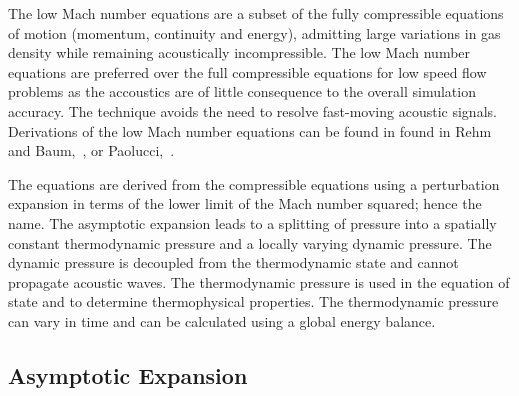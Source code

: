 The low Mach number equations are a subset of the fully compressible
equations of motion (momentum, continuity and energy), admitting large
variations in gas density while remaining acoustically incompressible.
The low Mach number equations are preferred over the full compressible
equations for low speed flow problems as the accoustics are of 
little consequence to the overall simulation accuracy. The technique avoids 
the need to resolve fast-moving acoustic signals.  
Derivations of the low Mach number equations can be found in 
found in Rehm and Baum,~\cite{Rehm:1978}, or Paolucci,~\cite{Paolucci:1982}. 

The equations are derived from
the compressible equations using a perturbation expansion in terms
of the lower limit of the Mach number squared; hence the name.  The
asymptotic expansion leads to a splitting of pressure
into a spatially constant thermodynamic pressure and a locally
varying dynamic pressure.  The dynamic pressure is decoupled from
the thermodynamic state and cannot propagate acoustic waves.  The
thermodynamic pressure is used in the equation of state and
to determine thermophysical properties.  The thermodynamic pressure
can vary in time and can be calculated using a global energy balance.

\subsection{Asymptotic Expansion}
\label{asymExp}

